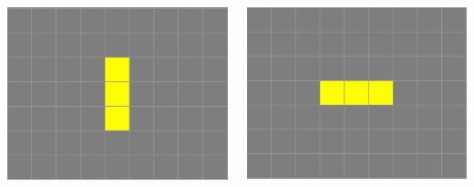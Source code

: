 \documentclass[20pt,margin=2.2cm,innermargin=-4.5in,blockverticalspace=-0.25in]{tikzposter}
\begin{document}
\begin{columns}
{        \begin{minipage}[t]{\linewidth}
            \centering
            \begin{minipage}[t]{0.4\linewidth}
                \includegraphics[width=\textwidth]{images/life-1.png}
            \end{minipage}
            \begin{minipage}[t]{0.4\linewidth}
                \setlength{\parindent}{1em}
                \includegraphics[width=\textwidth]{images/life-2.png}
            \end{minipage}
        \end{minipage}

}
\end{columns}
\end{document}
